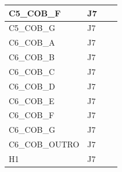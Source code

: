 \begin{longtable}{|l|l|l|l|}
C5\_COB\_F                           & J7                                                &                                                  &                                                  \\ \hline
C5\_COB\_G                           & J7                                                &                                                  &                                                  \\ \hline
C6\_COB\_A                           & J7                                                &                                                  &                                                  \\ \hline
C6\_COB\_B                           & J7                                                &                                                  &                                                  \\ \hline
C6\_COB\_C                           & J7                                                &                                                  &                                                  \\ \hline
C6\_COB\_D                           & J7                                                &                                                  &                                                  \\ \hline
C6\_COB\_E                           & J7                                                &                                                  &                                                  \\ \hline
C6\_COB\_F                           & J7                                                &                                                  &                                                  \\ \hline
C6\_COB\_G                           & J7                                                &                                                  &                                                  \\ \hline
C6\_COB\_OUTRO                           & J7                                                &                                                  &                                                  \\ \hline
H1                           & J7                                                &                                                  &                                                  \\ \hline

\end{longtable}
